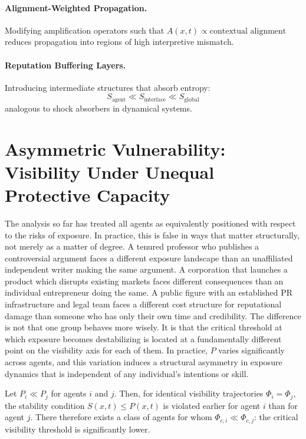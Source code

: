 \documentclass[12pt,a4paper]{article}
\begin{document}
\paragraph{Alignment-Weighted Propagation.}
Modifying amplification operators such that $A(x,t) \propto \text{contextual alignment}$ reduces propagation into regions of high interpretive mismatch.

\paragraph{Reputation Buffering Layers.}
Introducing intermediate structures that absorb entropy:
\[
S_{\text{agent}} \ll S_{\text{interface}} \ll S_{\text{global}}
\]
analogous to shock absorbers in dynamical systems.

\section{Asymmetric Vulnerability: Visibility Under Unequal Protective Capacity}

The analysis so far has treated all agents as equivalently positioned with respect to the risks of exposure. In practice, this is false in ways that matter structurally, not merely as a matter of degree. A tenured professor who publishes a controversial argument faces a different exposure landscape than an unaffiliated independent writer making the same argument. A corporation that launches a product which disrupts existing markets faces different consequences than an individual entrepreneur doing the same. A public figure with an established PR infrastructure and legal team faces a different cost structure for reputational damage than someone who has only their own time and credibility. The difference is not that one group behaves more wisely. It is that the critical threshold at which exposure becomes destabilizing is located at a fundamentally different point on the visibility axis for each of them. In practice, $P$ varies significantly across agents, and this variation induces a structural asymmetry in exposure dynamics that is independent of any individual's intentions or skill.

Let $P_i \ll P_j$ for agents $i$ and $j$. Then, for identical visibility trajectories $\Phi_i = \Phi_j$, the stability condition $S(x,t) \leq P(x,t)$ is violated earlier for agent $i$ than for agent $j$. There therefore exists a class of agents for whom $\Phi_{c,i} \ll \Phi_{c,j}$: the critical visibility threshold is significantly lower.
\end{document}
